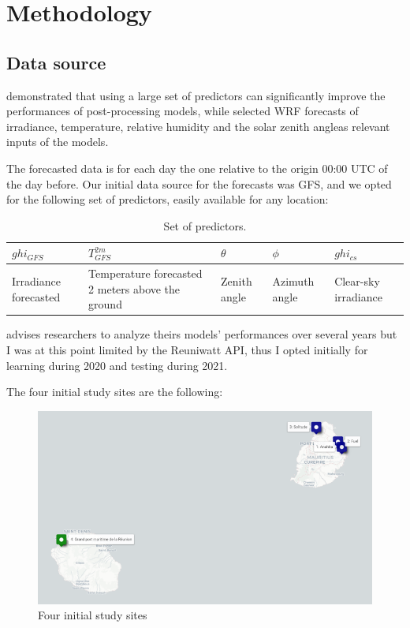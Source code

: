 \section{Methodology}
\label{sec:methodo}
\subsection{Data source}
\cite{verbois_statistical_2022} demonstrated that using a large set of predictors can significantly improve the performances of post-processing models, while \cite{suksamosorn_post-processing_2021}
selected WRF forecasts of irradiance, temperature, relative humidity and the solar zenith angleas relevant inputs of the models.

The forecasted data is for each day the one relative to the origin 00:00 UTC of the day before.
Our initial data source for the forecasts was GFS, and we opted for the following set of predictors, easily available for any location:

\begin{table}[h]
    \centering
    \begin{tabularx}{\textwidth} { 
  | >{\centering\arraybackslash}X 
  | >{\centering\arraybackslash}X 
  | >{\centering\arraybackslash}X 
  | >{\centering\arraybackslash}X
  | >{\centering\arraybackslash}X 
  |}
 \hline
 $ghi_{GFS}$ & $T_{GFS}^{2m}$ & $\theta$ & $\phi$ & $ghi_{cs}$ \\
 \hline
 \scriptsize Irradiance forecasted  & \scriptsize Temperature forecasted 2 meters above the ground & \scriptsize Zenith angle & \scriptsize Azimuth angle & \scriptsize Clear-sky irradiance \\
\hline
\end{tabularx}
    \caption{Set of predictors.}
    \label{tab:set_pred}
\end{table}

\cite{verbois_statistical_2022} advises researchers to analyze theirs models' performances over several years but I was at this point limited by the Reuniwatt API, thus
I opted initially for learning during 2020 and testing during 2021.

The four initial study sites are the following:
\begin{figure}[htb!]
    \centering
    \includegraphics[width=\textwidth]{figures/initial_study_sites.png}
    \caption{Four initial study sites}
\end{figure}
